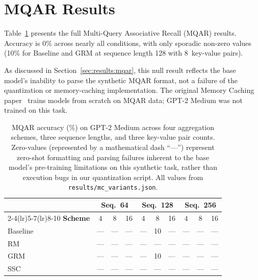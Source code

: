 
\section{MQAR Results}
\label{app:mqar}

Table~\ref{tab:mqar} presents the full Multi-Query Associative Recall
(MQAR) results.
Accuracy is 0\% across nearly all conditions, with only sporadic
non-zero values (10\% for Baseline and GRM at sequence length 128 with
8~key-value pairs).

As discussed in Section~\ref{sec:results:mqar}, this null result
reflects the base model's inability to parse the synthetic MQAR format,
not a failure of the quantization or memory-caching implementation.
The original Memory Caching paper~\cite{behrouz2026mc} trains models
from scratch on MQAR data; GPT-2 Medium was not trained on this task.

\begin{table}[H]
\centering
\caption{MQAR accuracy (\%) on GPT-2 Medium across four aggregation schemes, three sequence lengths, and three key-value pair counts. Zero-values (represented by a mathematical dash ``---'') represent zero-shot formatting and parsing failures inherent to the base model's pre-training limitations on this synthetic task, rather than execution bugs in our quantization script. All values from \texttt{results/mc\_variants.json}.}
\label{tab:mqar}
\small
\begin{tabular}{@{}lccccccccc@{}}
\toprule
& \multicolumn{3}{c}{\textbf{Seq.\ 64}} &
  \multicolumn{3}{c}{\textbf{Seq.\ 128}} &
  \multicolumn{3}{c}{\textbf{Seq.\ 256}} \\
\cmidrule(lr){2-4}\cmidrule(lr){5-7}\cmidrule(lr){8-10}
\textbf{Scheme} & 4 & 8 & 16 & 4 & 8 & 16 & 4 & 8 & 16 \\
\midrule
Baseline & --- & --- & --- & --- & 10  & --- & --- & --- & --- \\
RM       & --- & --- & --- & --- & --- & --- & --- & --- & --- \\
GRM      & --- & --- & --- & --- & 10  & --- & --- & --- & --- \\
SSC      & --- & --- & --- & --- & --- & --- & --- & --- & --- \\
\bottomrule
\end{tabular}
\end{table}
